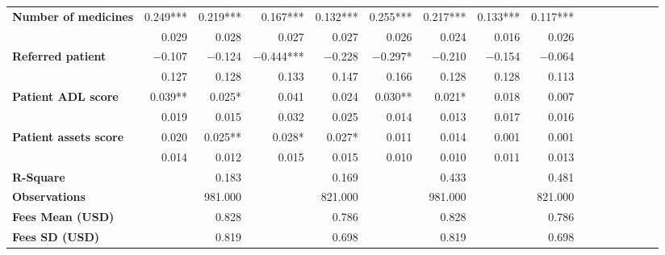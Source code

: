\begin{tabular}{@{\extracolsep{5pt}}lrrrrrrrrrrrrrrr}
{\bf Number of medicines} & 0.249*** & 0.219*** & 0.167*** & 0.132*** & 0.255*** & 0.217*** & 0.133*** & 0.117*** \\
{\bf } & 0.029\phantom{***} & 0.028\phantom{***} & 0.027\phantom{***} & 0.027\phantom{***} & 0.026\phantom{***} & 0.024\phantom{***} & 0.016\phantom{***} & 0.026\phantom{***} \\
{\bf Referred patient} & $-$0.107\phantom{***} & $-$0.124\phantom{***} & $-$0.444*** & $-$0.228\phantom{***} & $-$0.297*\phantom{**} & $-$0.210\phantom{***} & $-$0.154\phantom{***} & $-$0.064\phantom{***} \\
{\bf } & 0.127\phantom{***} & 0.128\phantom{***} & 0.133\phantom{***} & 0.147\phantom{***} & 0.166\phantom{***} & 0.128\phantom{***} & 0.128\phantom{***} & 0.113\phantom{***} \\
{\bf Patient ADL score} & 0.039**\phantom{*} & 0.025*\phantom{**} & 0.041\phantom{***} & 0.024\phantom{***} & 0.030**\phantom{*} & 0.021*\phantom{**} & 0.018\phantom{***} & 0.007\phantom{***} \\
{\bf } & 0.019\phantom{***} & 0.015\phantom{***} & 0.032\phantom{***} & 0.025\phantom{***} & 0.014\phantom{***} & 0.013\phantom{***} & 0.017\phantom{***} & 0.016\phantom{***} \\
{\bf Patient assets score} & 0.020\phantom{***} & 0.025**\phantom{*} & 0.028*\phantom{**} & 0.027*\phantom{**} & 0.011\phantom{***} & 0.014\phantom{***} & 0.001\phantom{***} & 0.001\phantom{***} \\
{\bf } & 0.014\phantom{***} & 0.012\phantom{***} & 0.015\phantom{***} & 0.015\phantom{***} & 0.010\phantom{***} & 0.010\phantom{***} & 0.011\phantom{***} & 0.013\phantom{***} \\
{\bf R-Square} & \phantom{***} & 0.183\phantom{***} & \phantom{***} & 0.169\phantom{***} & \phantom{***} & 0.433\phantom{***} & \phantom{***} & 0.481\phantom{***} \\
{\bf Observations} & \phantom{***} & 981.000\phantom{***} & \phantom{***} & 821.000\phantom{***} & \phantom{***} & 981.000\phantom{***} & \phantom{***} & 821.000\phantom{***} \\
{\bf Fees Mean (USD)} & \phantom{***} & 0.828\phantom{***} & \phantom{***} & 0.786\phantom{***} & \phantom{***} & 0.828\phantom{***} & \phantom{***} & 0.786\phantom{***} \\
{\bf Fees SD (USD)} & \phantom{***} & 0.819\phantom{***} & \phantom{***} & 0.698\phantom{***} & \phantom{***} & 0.819\phantom{***} & \phantom{***} & 0.698\phantom{***} \\
\hline
\end{tabular}
